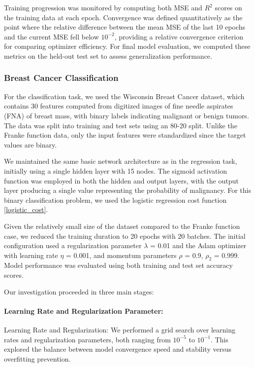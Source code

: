 Training progression was monitored by computing both MSE and \( R^2 \) scores on the training data at each epoch. Convergence was defined quantitatively as the point where the relative difference between the mean MSE of the last 10 epochs and the current MSE fell below \( 10^{-2} \), providing a relative convergence criterion for comparing optimizer efficiency. For final model evaluation, we computed these metrics on the held-out test set to assess generalization performance.
\subsubsection{Breast Cancer Classification}

For the classification task, we used the Wisconsin Breast Cancer dataset, which contains 30 features computed from digitized images of fine needle aspirates (FNA) of breast mass, with binary labels indicating malignant or benign tumors. The data was split into training and test sets using an 80-20 split. Unlike the Franke function data, only the input features were standardized since the target values are binary.

We maintained the same basic network architecture as in the regression task, initially using a single hidden layer with 15 nodes. The sigmoid activation function was employed in both the hidden and output layers, with the output layer producing a single value representing the probability of malignancy. For this binary classification problem, we used the logistic regression cost function \cref{logistic_cost}.

Given the relatively small size of the dataset compared to the Franke function case, we reduced the training duration to 20 epochs with 20 batches. The initial configuration used a regularization parameter \( \lambda \) = 0.01 and the Adam optimizer with learning rate \( \eta \) = 0.001, and momentum parameters \( \rho \) = 0.9, \( \rho_2 \) = 0.999. Model performance was evaluated using both training and test set accuracy scores.

Our investigation proceeded in three main stages:

\paragraph*{Learning Rate and Regularization Parameter:}
Learning Rate and Regularization: We performed a grid search over learning rates and regularization parameters, both ranging from \( 10^{-5} \) to \( 10^{-1} \). This explored the balance between model convergence speed and stability versus overfitting prevention.

